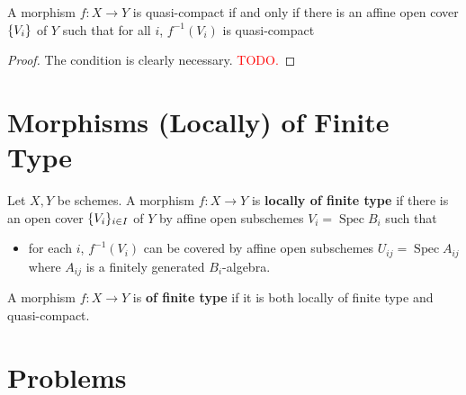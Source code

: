 \documentclass[12pt]{book}
\newcommand{\inlinedef}[1]{\textcolor{oxfordblue}{\bfseries #1}}
\theoremstyle{definition}
\DeclarePairedDelimiter{\Set}{\lbrace}{\rbrace}
\DeclareMathOperator{\Spec}{Spec}
\newcommand{\todo}[1]{\textcolor{red}{#1}}
\begin{document}
	\begin{proposition}
		A morphism $f \colon X \to Y$ is quasi-compact if and only if there is an affine open cover $\Set{V_i}$ of $Y$ such that for all $i$, $f^{-1}(V_i)$ is quasi-compact
	\end{proposition}
	
	\begin{proof}
		The condition is clearly necessary. \todo{{TODO.}}
	\end{proof}
	
	\section{Morphisms (Locally) of Finite Type}
	\begin{definition}
		Let $X, Y$ be schemes. A morphism $f \colon X \to Y$ is \inlinedef{locally of finite type} if there is an open cover $\Set{V_i}_{i \in I}$ of $Y$ by affine open subschemes $V_i = \Spec B_i$ such that
		\begin{itemize}
			\item  for each $i$, $f^{-1}(V_i)$ can be covered by affine open subschemes $U_{ij} = \Spec A_{ij}$ where $A_{ij}$ is a finitely generated $B_i$-algebra.
		\end{itemize}
	\end{definition}
	
	\begin{definition}
		A morphism $f\colon X \to Y$ is \inlinedef{of finite type} if it is both locally of finite type and quasi-compact.
	\end{definition}
	
	\section{Problems}
	
\end{document}
